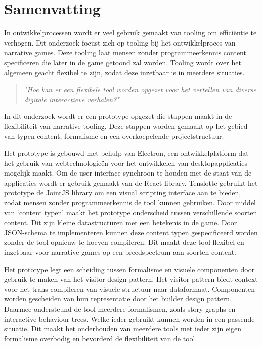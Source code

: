 \chapter*{Samenvatting}
In ontwikkelprocessen wordt er veel gebruik gemaakt van tooling om efficiëntie te verhogen. Dit onderzoek focust zich op tooling bij het ontwikkelproces van narrative games. Deze tooling laat mensen zonder programmeerkennis content specificeren die later in de game getoond zal worden. Tooling wordt over het algemeen geacht flexibel te zijn, zodat deze inzetbaar is in meerdere situaties.
\begin{quote} 
    \centering
    \large
    \textit{
        "Hoe kan er een flexibele tool worden opgezet voor het vertellen van diverse digitale interactieve verhalen?"
    }
\end{quote}

\noindent In dit onderzoek wordt er een prototype opgezet die stappen maakt in de flexibiliteit van narrative tooling. Deze stappen worden gemaakt op het gebied van typen content, formalisme en een overkoepelende projectstructuur.

Het prototype is gebouwd met behulp van Electron, een ontwikkelplatform dat het gebruik van webtechnologieën voor het ontwikkelen van desktopapplicaties mogelijk maakt. Om de user interface synchroon te houden met de staat van de applicaties wordt er gebruik gemaakt van de React library. Tenslotte gebruikt het prototype de JointJS library om een visual scripting interface aan te bieden, zodat mensen zonder programmeerkennis de tool kunnen gebruiken.
Door middel van ‘content typen’ maakt het prototype onderscheid tussen verschillende soorten content. Dit zijn kleine datastructuren met een betekenis in de game. Door JSON-schema te implementeren kunnen deze content typen gespecificeerd worden zonder de tool opnieuw te hoeven compileren. Dit maakt deze tool flexibel en inzetbaar voor narrative games op een breedspectrum aan soorten content.

Het prototype legt een scheiding tussen formalisme en visuele componenten door gebruik te maken van het visitor design pattern. Het visitor pattern biedt context voor het trans compileren van visuele structuur naar dataformaat. Componenten worden gescheiden van hun representatie door het builder design pattern. Daarmee ondersteund de tool meerdere formalismen, zoals story graphs en interactive behaviour trees. Welke ieder gebruikt kunnen worden in een passende situatie. Dit maakt het onderhouden van meerdere tools met ieder zijn eigen formalisme overbodig en bevorderd de flexibiliteit van de tool.

